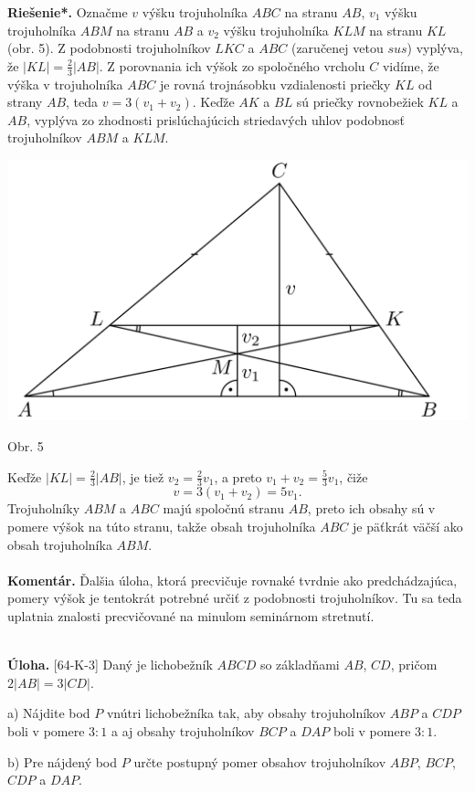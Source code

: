 \documentclass[11pt,a4paper,oneside,final]{book}
\newcommand{\kom}{\textbf{Komentár.} }
\newcommand{\ul}{\textbf{Úloha.} }
\newcommand{\rieh}{\textbf{Riešenie*.} }
\begin{document}
\rieh Označme $v$ výšku trojuholníka $ABC$ na stranu $AB$, $v_1$ výšku trojuholníka $ABM$ na stranu $AB$ a $v_2$ výšku trojuholníka $KLM$ na stranu $KL$ (obr. 5). Z podobnosti trojuholníkov $LKC$ a $ABC$ (zaručenej vetou $sus$) vyplýva, že $|KL| =\frac{2}{3} |AB|$. Z porovnania ich výšok zo spoločného vrcholu $C$ vidíme, že výška v trojuholníka $ABC$ je rovná trojnásobku vzdialenosti priečky $KL$ od strany $AB$, teda $v = 3(v_1 +v_2)$. Keďže $AK$ a $BL$ sú priečky rovnobežiek $KL$ a $AB$, vyplýva zo zhodnosti prislúchajúcich striedavých uhlov podobnosť trojuholníkov $ABM$ a $KLM$.
\begin{center}
\includegraphics[scale=0.3]{64S2}

Obr. 5
\end{center}
Keďže $|KL| =\frac{2}{3}|AB|$, je tiež $v_2 =\frac{2}{3}v_1$, a preto $v_1 + v_2 =\frac{5}{3}v_1$, čiže
$$v = 3(v_1 + v_2) = 5v_1.$$
Trojuholníky $ABM$ a $ABC$ majú spoločnú stranu $AB$, preto ich obsahy sú v pomere výšok na túto stranu, takže obsah trojuholníka $ABC$ je päťkrát väčší ako obsah trojuholníka $ABM$.\\
\\
\kom Ďalšia úloha, ktorá precvičuje rovnaké tvrdnie ako predchádzajúca, pomery výšok je tentokrát potrebné určiť z podobnosti trojuholníkov. Tu sa teda uplatnia znalosti precvičované na minulom seminárnom stretnutí. \\
\\
\begin{tcolorbox}[breakable,notitle,boxrule=0pt,colback=light-gray,colframe=light-gray]\ul [64-K-3]  Daný je lichobežník $ABCD$ so základňami $AB$, $CD$, pričom $2|AB| = 3|CD|$.

a) Nájdite bod $P$ vnútri lichobežníka tak, aby obsahy trojuholníkov $ABP$ a $CDP$ boli v pomere $3 : 1$ a aj obsahy trojuholníkov $BCP$ a $DAP$ boli v pomere $3 : 1$.

b) Pre nájdený bod $P$ určte postupný pomer obsahov trojuholníkov $ABP$, $BCP$, $CDP$ a $DAP$.

\end{tcolorbox}
\end{document}
